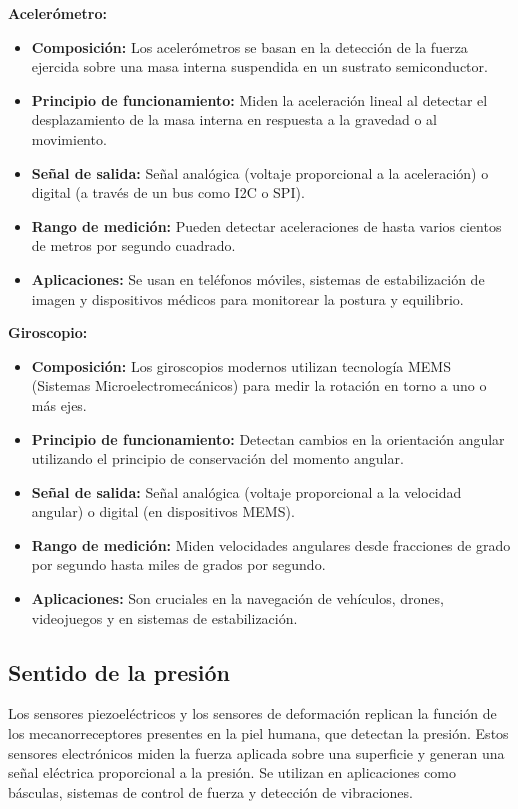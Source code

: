 \documentclass[conference]{IEEEtran}
\begin{document}
\textbf{Acelerómetro:}
\begin{itemize}
    \item \textbf{Composición:} Los acelerómetros se basan en la detección de la fuerza ejercida sobre una masa interna suspendida en un sustrato semiconductor.
    \item \textbf{Principio de funcionamiento:} Miden la aceleración lineal al detectar el desplazamiento de la masa interna en respuesta a la gravedad o al movimiento.
    \item \textbf{Señal de salida:} Señal analógica (voltaje proporcional a la aceleración) o digital (a través de un bus como I2C o SPI).
    \item \textbf{Rango de medición:} Pueden detectar aceleraciones de hasta varios cientos de metros por segundo cuadrado.
    \item \textbf{Aplicaciones:} Se usan en teléfonos móviles, sistemas de estabilización de imagen y dispositivos médicos para monitorear la postura y equilibrio.
\end{itemize}

\textbf{Giroscopio:}
\begin{itemize}
    \item \textbf{Composición:} Los giroscopios modernos utilizan tecnología MEMS (Sistemas Microelectromecánicos) para medir la rotación en torno a uno o más ejes.
    \item \textbf{Principio de funcionamiento:} Detectan cambios en la orientación angular utilizando el principio de conservación del momento angular.
    \item \textbf{Señal de salida:} Señal analógica (voltaje proporcional a la velocidad angular) o digital (en dispositivos MEMS).
    \item \textbf{Rango de medición:} Miden velocidades angulares desde fracciones de grado por segundo hasta miles de grados por segundo.
    \item \textbf{Aplicaciones:} Son cruciales en la navegación de vehículos, drones, videojuegos y en sistemas de estabilización.
\end{itemize}

\subsection{Sentido de la presión}

Los sensores piezoeléctricos y los sensores de deformación replican la función de los mecanorreceptores presentes en la piel humana, que detectan la presión. Estos sensores electrónicos miden la fuerza aplicada sobre una superficie y generan una señal eléctrica proporcional a la presión. Se utilizan en aplicaciones como básculas, sistemas de control de fuerza y detección de vibraciones.\\
\end{document}
